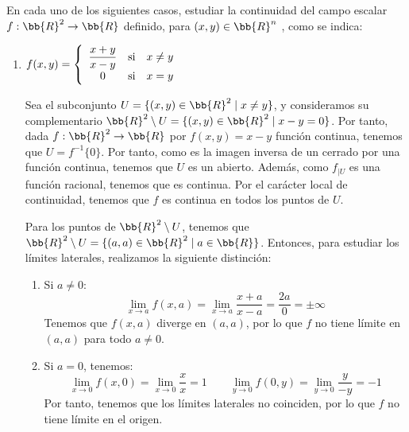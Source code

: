\begin{ejercicio}
    En cada uno de los siguientes casos, estudiar la continuidad del campo escalar $f : \bb{R}^2 \to \bb{R}$ definido, para $(x, y) \in \bb{R}^n$ , como se indica:
    \begin{enumerate}
        \item $\displaystyle
            f(x,y)=
            \left\{\begin{array}{ccc}
                \displaystyle \frac{x+y}{x-y} &\text{si}& x\neq y\\
                0 &\text{si}& x=y
            \end{array}\right. \displaystyle$

        Sea el subconjunto $U=\{(x,y)\in \bb{R}^2\mid x\neq y\}$, y consideramos su complementario $\bb{R}^2\setminus U=\{(x,y)\in \bb{R}^2\mid x-y=0\}$. Por tanto, dada $f:\bb{R}^2\to \bb{R}$ por $f(x,y)=x-y$ función continua, tenemos que $U=f^{-1}\{0\}$. Por tanto, como es la imagen inversa de un cerrado por una función continua, tenemos que $U$ es un abierto. Además, como $f_{\big|U}$ es una función racional, tenemos que es continua. Por el carácter local de continuidad, tenemos que $f$ es continua en todos los puntos de $U$.

        Para los puntos de $\bb{R}^2\setminus U$, tenemos que $\bb{R}^2\setminus U=\{(a,a)\in \bb{R}^2\mid a\in \bb{R}\}$. Entonces, para estudiar los límites laterales, realizamos la siguiente distinción:
        \begin{enumerate}
            \item Si $a\neq 0$:
            \begin{equation*}
                \lim_{x\to a}f(x,a)=
                \lim_{x\to a}\frac{x+a}{x-a} = \frac{2a}{0}=\pm \infty
            \end{equation*}
            Tenemos que $f(x,a)$ diverge en $(a,a)$, por lo que $f$ no tiene límite en $(a,a)$ para todo $a\neq 0$.

            \item Si $a=0$, tenemos:
            \begin{equation*}
                \lim_{x\to 0}f(x,0)=
                \lim_{x\to 0}\frac{x}{x} =1
                \qquad
                \lim_{y\to 0}f(0,y)=
                \lim_{y\to 0}\frac{y}{-y} =-1
            \end{equation*}
            Por tanto, tenemos que los límites laterales no coinciden, por lo que $f$ no tiene límite en el origen.
        \end{enumerate}


\end{enumerate}
\end{ejercicio}
